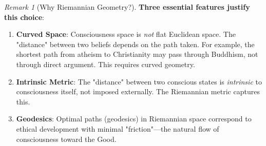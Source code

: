 \documentclass[11pt,a4paper]{article}
\theoremstyle{definition}
\theoremstyle{remark}
\newtheorem{remark}{Remark}[section]
\newcommand{\cc}{\mathbf{c}}
\begin{document}
\begin{small}
\begin{remark}[Why Riemannian Geometry?]
\textbf{Three essential features justify this choice}:

\begin{enumerate}
    \item \textbf{Curved Space}: Consciousness space is \textit{not} flat Euclidean space. The "distance" between two beliefs depends on the path taken. For example, the shortest path from atheism to Christianity may pass through Buddhism, not through direct argument. This requires curved geometry.
    
    \item \textbf{Intrinsic Metric}: The "distance" between two conscious states is \textit{intrinsic} to consciousness itself, not imposed externally. The Riemannian metric captures this.
    
    \item \textbf{Geodesics}: Optimal paths (geodesics) in Riemannian space correspond to ethical development with minimal "friction"—the natural flow of consciousness toward the Good.
\end{enumerate}
\end{remark}

\begin{figure}[H]
\centering
{}
\end{figure}
\end{small}
\end{document}
